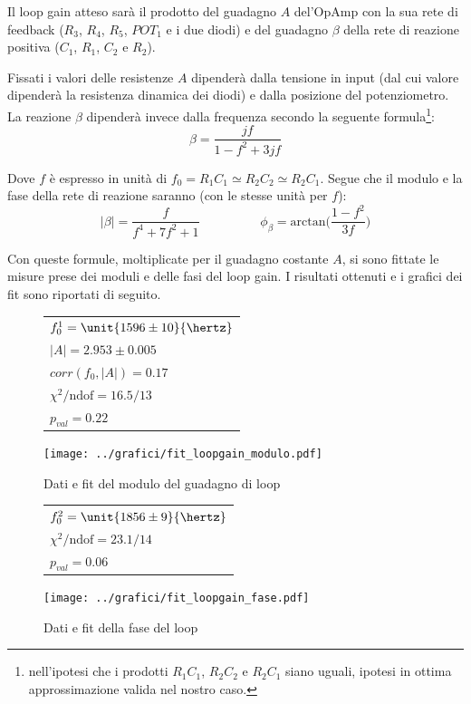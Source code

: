 \documentclass[10pt,a4paper]{article}
\begin{document}
Il loop gain atteso sarà il prodotto del guadagno $A$ del'OpAmp con la sua rete di feedback ($R_3$, $R_4$, $R_5$, $POT_1$ e i due diodi) e del guadagno $\beta$ della rete di reazione positiva ($C_1$, $R_1$, $C_2$ e $R_2$).

Fissati i valori delle resistenze $A$ dipenderà dalla tensione in input (dal cui valore dipenderà la resistenza dinamica dei diodi) e dalla posizione del potenziometro. La reazione $\beta$ dipenderà invece dalla frequenza secondo la seguente formula\footnote{nell'ipotesi che i prodotti $R_1 C_1$, $R_2  C_2$ e $R_2  C_1$ siano uguali, ipotesi in ottima approssimazione valida nel nostro caso.}:
\begin{equation*}
\beta = \frac{jf}{1-f^2+3jf}
\end{equation*}

Dove $f$ è espresso in unità di $f_0 = R_1C_1 \simeq R_2C_2 \simeq R_2C_1$. Segue che il modulo e la fase della rete di reazione saranno (con le stesse unità per $f$):
\begin{equation}
|\beta|=\frac{f}{f^4+7f^2+1}\hspace{2cm}\phi_{\beta} = \text{arctan} \biggl( \frac{1-f^2}{3f} \biggr)
\label{eq:beta}
\end{equation}

Con queste formule, moltiplicate per il guadagno costante $A$, si sono fittate le misure prese dei moduli e delle fasi del loop gain. I risultati ottenuti e i grafici dei fit sono riportati di seguito.
\begin{figure}[H]
	\begin{minipage}{0.2\textwidth}
		\begin{tabular}{l}
			$f_0^1 = \unit{1596 \pm 10}{\hertz}$ \\
			$|A| = 2.953 \pm 0.005$\\
			$corr(f_0,|A|) = 0.17$\\
			$\chi^2 /\text{ndof} = 16.5 / 13 $\\
			$p_{val} = 0.22$
		\end{tabular}
	\end{minipage}
	\begin{minipage}{0.8\textwidth}
		\centering
		\texttt{[image: ../grafici/fit\_loopgain\_modulo.pdf]}
		\caption{Dati e fit del modulo del guadagno di loop}
		\label{fig:Bode}
	\end{minipage}
\end{figure}

\begin{figure}[H]
	\begin{minipage}{0.2\textwidth}
		\begin{tabular}{l}
			$f_0^2 = \unit{1856 \pm 9}{\hertz}$ \\
			$\chi^2 /\text{ndof} = 23.1 / 14 $\\
			$p_{val} = 0.06$
		\end{tabular}
	\end{minipage}
	\begin{minipage}{0.8\textwidth}
		\centering
		\texttt{[image: ../grafici/fit\_loopgain\_fase.pdf]}
		\caption{Dati e fit della fase del loop}
		\label{fig:Bode}
	\end{minipage}
\end{figure}
\end{document}

